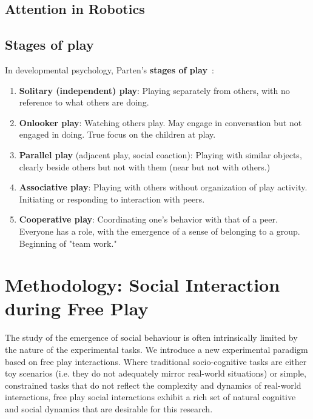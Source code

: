 \documentclass[a4paper]{article}
\newcommand{\ie}{i.e.\xspace}
\begin{document}
\subsection{Attention in Robotics}

\subsection{Stages of play}

In developmental psychology, Parten's {\bf stages of
play}~\cite{parten1932social}:

\begin{enumerate}
    \item {\bf Solitary (independent) play}: Playing separately from
        others, with no reference to what others are doing.
    \item {\bf Onlooker play}: Watching others play. May engage in
        conversation but not engaged in doing. True focus on the children at
        play.
    \item {\bf Parallel play} (adjacent play, social coaction): Playing
        with similar objects, clearly beside others but not with them (near
        but not with others.)
    \item {\bf Associative play}:  Playing with others without
        organization of play activity. Initiating or responding to
        interaction with peers. 
    \item {\bf Cooperative play}: Coordinating one’s behavior with that
        of a peer. Everyone has a role, with the emergence of a sense of
        belonging to a group. Beginning of "team work."
\end{enumerate}



\section{Methodology: Social Interaction during Free Play}


The study of the emergence of social behaviour is often intrinsically limited by
the nature of the experimental tasks. We introduce a new
experimental paradigm based on free play interactions. Where traditional
socio-cognitive tasks are either toy scenarios (\ie they do not adequately
mirror real-world situations) or simple, constrained tasks that do not reflect
the complexity and dynamics of real-world interactions, free play social
interactions exhibit a rich set of natural cognitive and social dynamics that
are desirable for this research.
\end{document}
